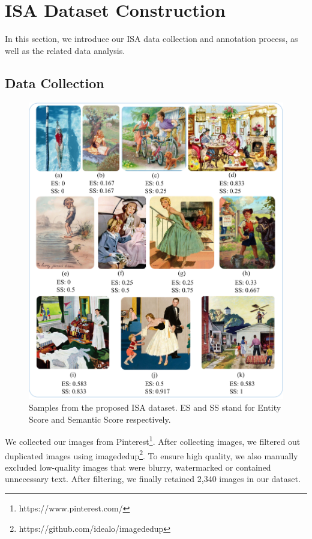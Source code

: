 
\section{ISA Dataset Construction}

In this section, we introduce our ISA data collection and annotation process, as well as the related data analysis.

\subsection{Data Collection}


\begin{figure}[h]
    \centering
    \includegraphics[scale=0.5]{figs/samples3.pdf}
    \caption{Samples from the proposed ISA dataset. ES and SS stand for Entity Score and Semantic Score respectively.}
    \label{samples}
\end{figure}


We collected our images from Pinterest\footnote{https://www.pinterest.com/}. 
After collecting images, we filtered out duplicated images using imagededup\footnote{https://github.com/idealo/imagededup}. 
To ensure high quality, we also manually excluded low-quality images that were blurry, watermarked or contained unnecessary text. 
After filtering, we finally retained 2,340 images in our dataset.


